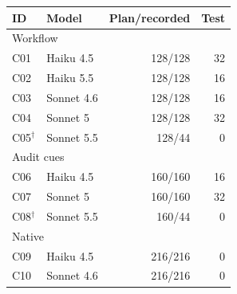 \begin{tabular}{llrr}
\toprule
ID & Model & Plan/recorded & Test \\
\midrule
\multicolumn{4}{l}{Workflow} \\
C01 & Haiku 4.5 & 128/128 & 32 \\
C02 & Haiku 5.5 & 128/128 & 16 \\
C03 & Sonnet 4.6 & 128/128 & 16 \\
C04 & Sonnet 5 & 128/128 & 32 \\
C05$^{\dagger}$ & Sonnet 5.5 & 128/44 & 0 \\
\multicolumn{4}{l}{Audit cues} \\
C06 & Haiku 4.5 & 160/160 & 16 \\
C07 & Sonnet 5 & 160/160 & 32 \\
C08$^{\dagger}$ & Sonnet 5.5 & 160/44 & 0 \\
\multicolumn{4}{l}{Native} \\
C09 & Haiku 4.5 & 216/216 & 0 \\
C10 & Sonnet 4.6 & 216/216 & 0 \\
\bottomrule
\end{tabular}
